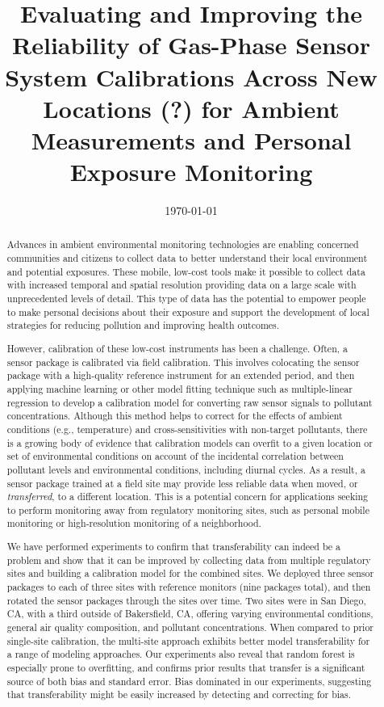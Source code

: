 \documentclass[journal abbreviation, manuscript]{copernicus}
\title{Evaluating and Improving the Reliability of Gas-Phase Sensor System Calibrations Across New Locations (?) for Ambient Measurements and Personal Exposure Monitoring}
\date{\today}
\affil[]{University of California, San Diego}
\affil[]{ADDRESS}
\begin{document}
\maketitle

\begin{abstract}

Advances in ambient environmental monitoring technologies are enabling concerned communities and citizens to collect data to better understand their local environment and potential exposures. These mobile, low-cost tools make it possible to collect data with increased temporal and spatial resolution providing data on a large scale with unprecedented levels of detail. This type of data has the potential to empower people to make personal decisions about their exposure and support the development of local strategies for reducing pollution and improving health outcomes.

However, calibration of these low-cost instruments has been a challenge.  Often, a sensor package is calibrated via field calibration. This involves colocating the sensor package with a high-quality reference instrument for an extended period, and then applying machine learning or other model fitting technique such as multiple-linear regression to develop a calibration model for converting raw sensor signals to pollutant concentrations.  Although this method helps to correct for the effects of ambient conditions (e.g., temperature) and cross-sensitivities with non-target pollutants, there is a growing body of evidence that calibration models can overfit to a given location or set of environmental conditions on account of the incidental correlation between pollutant levels and environmental conditions, including diurnal cycles.  As a result, a sensor package trained at a field site may provide less reliable data when moved, or \textit{transferred}, to a different location.  This is a potential concern for applications seeking to perform monitoring away from regulatory monitoring sites, such as personal mobile monitoring or high-resolution monitoring of a neighborhood.  




We have performed experiments to confirm that transferability can indeed be a problem and show that it can be improved by collecting data from multiple regulatory sites and building a calibration model for the combined sites. We deployed three sensor packages to each of three sites with reference monitors (nine packages total), and then rotated the sensor packages through the sites over time. Two sites were in San Diego, CA, with a third outside of Bakersfield, CA, offering varying environmental conditions, general air quality composition, and pollutant concentrations.  When compared to prior single-site calibration, the multi-site approach exhibits better model transferability for a range of modeling approaches.  Our experiments also reveal that random forest is especially prone to overfitting, and confirms prior results that transfer is a significant source of both bias and standard error.  Bias dominated in our experiments, suggesting that transferability might be easily increased by detecting and correcting for bias.


\end{abstract}
\end{document}
